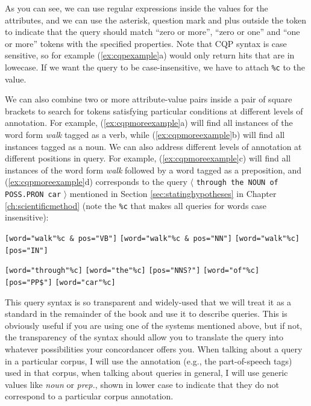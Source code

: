 As you can see, we can use regular expressions inside the values for the attributes, and we can use the asterisk, question mark and plus outside the token to indicate that the query should match ``zero or more'', ``zero or one'' and ``one or more'' tokens with the specified properties. Note that CQP syntax is case sensitive, so for example (\ref{ex:cqpexample}a) would only return hits that are in lowecase. If we want the query to be case-insensitive, we have to attach \texttt{\%c} to the value.

We can also combine two or more attribute-value pairs inside a pair of square brackets to search for tokens satisfying particular conditions at different levels of annotation. For example, (\ref{ex:cqpmoreexample}a) will find all instances of the word form \textit{walk} tagged as a verb, while (\ref{ex:cqpmoreexample}b) will find all instances tagged as a noun. We can also address different levels of annotation at different positions in query. For example, (\ref{ex:cqpmoreexample}c) will find all instances of the word form \textit{walk} followed by a word tagged as a preposition, and (\ref{ex:cqpmoreexample}d) corresponds to the query $\langle$ \texttt{through the NOUN of POSS.PRON car} $\rangle$ mentioned in Section \ref{sec:statinghypotheses} in Chapter \ref{ch:scientificmethod} (note the \texttt{\%c} that makes all queries for words case insensitive):


\begin{exe}
\ex
\begin{xlist} 
\label{ex:cqpmoreexample}
\ex \texttt{[word="walk"\%c \& pos="VB"]}
\ex \texttt{[word="walk"\%c \& pos="NN"]}
\ex \texttt{[word="walk"\%c]} \texttt{[pos="IN"]}
\ex \begin{minipage}[t]{0.85\textwidth} \raggedright \texttt{[word="through"\%c]} \texttt{[word="the"\%c]} \texttt{[pos="NNS?"]} \texttt{[word="of"\%c]} \texttt{[pos="PP\$"]} \texttt{[word="car"\%c]} \end{minipage}
\end{xlist}
\end{exe}

This query syntax is so transparent and widely-used that we will treat it as a standard in the remainder of the book and use it to describe queries. This is obviously useful if you are using one of the systems mentioned above, but if not, the transparency of the syntax should allow you to translate the query into whatever possibilities your concordancer offers you. When talking about a query in a particular corpus, I will use the annotation (e.g., the part-of-speech tags) used in that corpus, when talking about queries in general, I will use generic values like \textit{noun} or \textit{prep.}, shown in lower case to indicate that they do not correspond to a particular corpus annotation.

